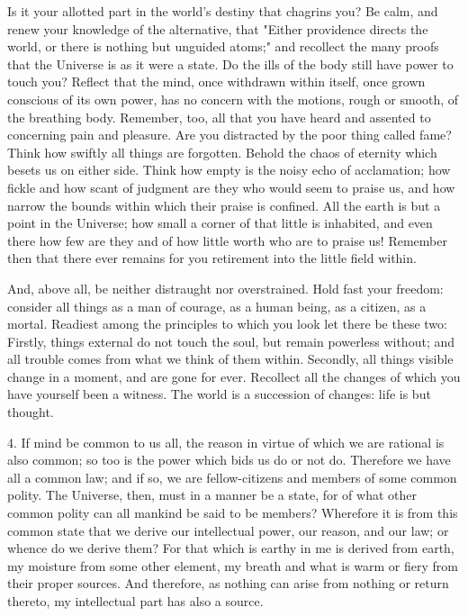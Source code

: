 \documentclass{book}
\begin{document}
Is it your allotted part in the world's destiny that chagrins you?
Be calm, and renew your knowledge of the alternative, that "Either
providence directs the world, or there is nothing but unguided atoms;"
and recollect the many proofs that the Universe is as it were a state.
Do the ills of the body still have power to touch you? Reflect that
the mind, once withdrawn within itself, once grown conscious of its
own power, has no concern with the motions, rough or smooth, of the
breathing body. Remember, too, all that you have heard and assented
to concerning pain and pleasure. Are you distracted by the poor thing
called fame? Think how swiftly all things are forgotten. Behold the
chaos of eternity which besets us on either side. Think how empty is
the noisy echo of acclamation; how fickle and how scant of judgment are
they who would seem to praise us, and how narrow the bounds within which
their praise is confined. All the earth is but a point in the Universe;
how small a corner of that little is inhabited, and even there how few
are they and of how little worth who are to praise us! Remember then
that there ever remains for you retirement into the little field within.

And, above all, be neither distraught nor overstrained. Hold fast your
freedom: consider all things as a man of courage, as a human being, as
a citizen, as a mortal. Readiest among the principles to which you look
let there be these two: Firstly, things external do not touch the soul,
but remain powerless without; and all trouble comes from what we think
of them within. Secondly, all things visible change in a moment, and are
gone for ever. Recollect all the changes of which you have yourself been
a witness. The world is a succession of changes: life is but thought.

4. If mind be common to us all, the reason in virtue of which we are
rational is also common; so too is the power which bids us do or not
do. Therefore we have all a common law; and if so, we are
fellow-citizens and members of some common polity. The Universe, then,
must in a manner be a state, for of what other common polity can all
mankind be said to be members? Wherefore it is from this common state
that we derive our intellectual power, our reason, and our law; or
whence do we derive them? For that which is earthy in me is derived
from earth, my moisture from some other element, my breath and what is
warm or fiery from their proper sources. And therefore, as nothing can
arise from nothing or return thereto, my intellectual part has also a
source.
\end{document}
